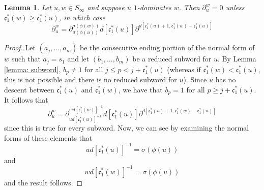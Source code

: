 \documentclass[reqno]{amsart}
\newtheorem{lemma}{Lemma}[subsection]
\newtheorem{proposition}[lemma]{Proposition}
\theoremstyle{definition}
\theoremstyle{remark}
\numberwithin{equation}{subsection}
\newcommand{\code}{\mathfrak{c}}
\begin{document}

\begin{lemma} \label{lemma:divform}
Let $u, w\in S_\infty$ and suppose $u$ $1$-dominates $w$. Then $\partial_u^w=0$ unless $\code_1^*(w)\geq\code_1^*(u)$, in which case
$$\partial_u^w=\partial_{\sigma(\phi(u))}^{\sigma(\phi(w))}d[\code_1^*(u)]\partial^{d[\code_1^*(u)+1,\code_1^*(w)-\code_1^*(u)]}$$
\end{lemma}
\begin{proof}
Let $(a_j,\ldots,a_m)$ be the consecutive ending portion of the normal form of $w$ such that $a_j=s_1$ and let $(b_1,\ldots,b_m)$ be a reduced subword for $u$. By Lemma \ref{lemma: subword}, $b_p\neq 1$ for all $j\leq p<j+\code_1^*(u)$ (whereas if $\code_1^*(w)<\code_1^*(u)$, this is not possible and there is no reduced subword for $u$). Since $u$ has no descent between $\code_1^*(u)$ and $\code_1^*(w)$, we have that $b_p=1$ for all $p\geq j+\code_1^*(u)$. It follows that
$$\partial_u^w=\partial_{ud[\code_1^*(u)]^{-1}}^{wd[\code_1^*(w)]^{-1}}d[\code_1^*(u)]\partial^{d[\code_1^*(u)+1,\code_1^*(w)-\code_1^*(u)]}$$
since this is true for every subword. Now, we can see by examining the normal forms of these elements that
$$ud[\code_1^*(u)]^{-1}=\sigma(\phi(u))$$
and
$$wd[\code_1^*(w)]^{-1}=\sigma(\phi(u))$$
and the result follows.
\end{proof}
\end{document}
